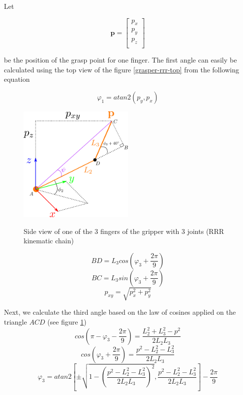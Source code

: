 Let

\[
\mathbf{p} = \begin{bmatrix} p_x \\ p_y \\ p_z \\ \end{bmatrix}
\]

be the position of the grasp point for one finger. The first angle can easily be calculated using the top view of the figure \ref{grasper-rrr-top} from the following equation

\begin{equation}
φ_1 = atan2 \left( p_y, p_x \right)
\end{equation}

\begin{center}
\begin{figure}[H]
\centering
\includegraphics[width=0.5\textwidth]{images/grasper-rrr-side.png}\\
\caption{Side view of one of the 3 fingers of the gripper with 3 joints (RRR kinematic chain)}
\label{grasper-rrr-side}
\end{figure}
\end{center}

\begin{equation}
BD = L_3 cos(φ_3 + \frac{2π}{9})
\end{equation}
\begin{equation}
BC = L_3 sin(φ_3 + \frac{2π}{9})
\end{equation}
\begin{equation}
p_{xy} = \sqrt{p_x^2 + p_y^2}
\end{equation}

Next, we calculate the third angle based on the law of cosines applied on the triangle $ACD$ (see figure \ref{grasper-rrr-side})
\begin{equation}
cos \left( π - φ_3 - \frac{2π}{9} \right) = \frac{L_2^2 + L_3^2 - p^2}{2 L_2 L_3}
\end{equation}
\begin{equation}
cos \left(φ_3 + \frac{2π}{9} \right) = \frac{p^2 - L_2^2 - L_3^2}{2 L_2 L_3}
\end{equation}
\begin{equation}
φ_3 = atan2 \left[ \pm \sqrt{1 - \left( \frac{p^2 - L_2^2 - L_3^2}{2 L_2 L_3} \right)^2} , \frac{p^2 - L_2^2 - L_3^2}{2 L_2 L_3} \right] - \frac{2π}{9}
\end{equation}

